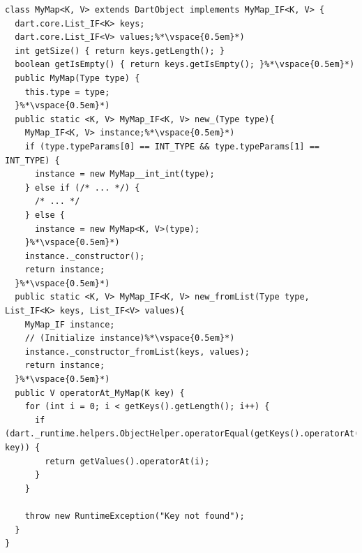 \documentclass[sigplan]{acmart}
\begin{document}
\begin{mdframed}[outerlinewidth=0.1pt,outerlinecolor=black,skipabove=4pt,
  innerleftmargin=5pt,innerrightmargin=0pt,innertopmargin=0pt,innerbottommargin=0pt]
\begin{lstlisting}[basicstyle=\scriptsize\ttfamily]
class MyMap<K, V> extends DartObject implements MyMap_IF<K, V> {
  dart.core.List_IF<K> keys;
  dart.core.List_IF<V> values;%*\vspace{0.5em}*)
  int getSize() { return keys.getLength(); }
  boolean getIsEmpty() { return keys.getIsEmpty(); }%*\vspace{0.5em}*)
  public MyMap(Type type) {
    this.type = type;
  }%*\vspace{0.5em}*)
  public static <K, V> MyMap_IF<K, V> new_(Type type){
  	MyMap_IF<K, V> instance;%*\vspace{0.5em}*)
    if (type.typeParams[0] == INT_TYPE && type.typeParams[1] == INT_TYPE) {
      instance = new MyMap__int_int(type);
    } else if (/* ... */) {
      /* ... */
    } else {
      instance = new MyMap<K, V>(type);
    }%*\vspace{0.5em}*)
    instance._constructor();
    return instance;
  }%*\vspace{0.5em}*)
  public static <K, V> MyMap_IF<K, V> new_fromList(Type type, List_IF<K> keys, List_IF<V> values){
  	MyMap_IF instance;
    // (Initialize instance)%*\vspace{0.5em}*)
    instance._constructor_fromList(keys, values);
    return instance;
  }%*\vspace{0.5em}*)
  public V operatorAt_MyMap(K key) {
    for (int i = 0; i < getKeys().getLength(); i++) {
      if (dart._runtime.helpers.ObjectHelper.operatorEqual(getKeys().operatorAt(i), key)) {
        return getValues().operatorAt(i);
      }
    }

    throw new RuntimeException("Key not found");
  }
}
\end{lstlisting}
\end{mdframed}
\end{document}
